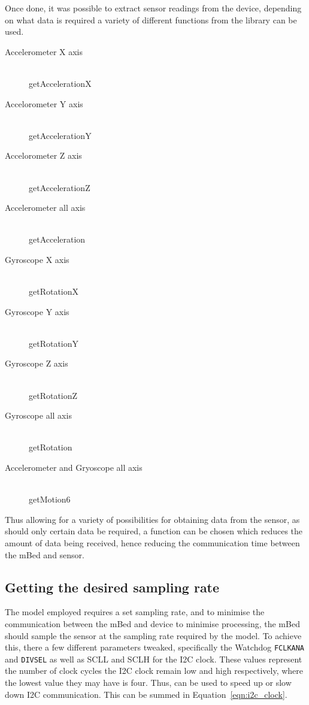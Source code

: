 Once done, it was possible to extract sensor readings from the device, depending on what data is required a variety of different functions from the library can be used.

\begin{description}
	\item[Accelerometer X axis] \hfill \\ getAccelerationX
	\item[Accelorometer Y axis] \hfill \\ getAccelerationY
	\item[Accelorometer Z axis] \hfill \\ getAccelerationZ
	\item[Accelerometer all axis] \hfill \\ getAcceleration
	\item[Gyroscope X axis] \hfill \\ getRotationX
	\item[Gyroscope Y axis] \hfill \\ getRotationY
	\item[Gyroscope Z axis] \hfill \\ getRotationZ
	\item[Gyroscope all axis] \hfill \\ getRotation
	\item[Accelerometer and Gryoscope all axis] \hfill \\ getMotion6
\end{description}


Thus allowing for a variety of possibilities for obtaining data from the sensor, as should only certain data be required, a function can be chosen which reduces the amount of data being received, hence reducing the communication time between the mBed and sensor.

\subsection{Getting the desired sampling rate}

The model employed requires a set sampling rate, and to minimise the communication between the mBed and device to minimise processing, the mBed should sample the sensor at the sampling rate required by the model. To achieve this, there a few different parameters tweaked, specifically the Watchdog \verb|FCLKANA| and \verb|DIVSEL| as well as SCLL and SCLH for the I2C clock. These values represent the number of clock cycles the I2C clock remain low and high respectively, where the lowest value they may have is four. Thus, can be used to speed up or slow down I2C communication. \cite{mbed_datasheet} This can be summed in Equation~\ref{eqn:i2c_clock}.

